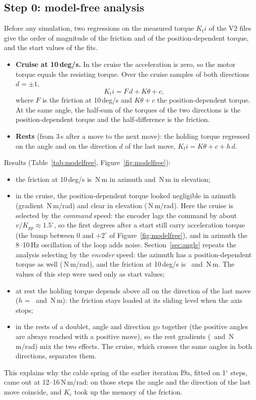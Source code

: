 \documentclass[10pt,a4paper]{article}
\numberwithin{equation}{section}
\begin{document}
\subsection{Step 0: model-free analysis}\label{sec:modelfree}
Before any simulation, two regressions on the measured torque $K_t i$ of the V2 files give the order of magnitude of the friction and of the position-dependent torque, and the start values of the fits.
\begin{itemize}
\item \textbf{Cruise at 10\,deg/s.} In the cruise the acceleration is zero, so the motor torque equals the resisting torque. Over the cruise samples of both directions $d=\pm1$,
\begin{equation}
K_t i = F\,d + K\theta + c ,\label{eq:cruise}
\end{equation}
where $F$ is the friction at 10\,deg/s and $K\theta+c$ the position-dependent torque. At the same angle, the half-sum of the torques of the two directions is the position-dependent torque and the half-difference is the friction.
\item \textbf{Rests} (from 3\,s after a move to the next move): the holding torque regressed on the angle and on the direction $d$ of the last move, $K_t i = K\theta+c+h\,d$.
\end{itemize}
Results (Table~\ref{tab:modelfree}, Figure~\ref{fig:modelfree}):
\begin{itemize}
\item the friction at 10\,deg/s is \FAz\,N\,m in azimuth and \FEl\,N\,m in elevation;
\item in the cruise, the position-dependent torque looked negligible in azimuth (gradient \KcrAz\,N\,m/rad) and clear in elevation (\KcrEl\,N\,m/rad). Here the cruise is selected by the \emph{command} speed: the encoder lags the command by about $v/K_{pp}\approx1.5^\circ$, so the first degrees after a start still carry acceleration torque (the bump between 0 and $+2^\circ$ of Figure~\ref{fig:modelfree}), and in azimuth the 8--10\,Hz oscillation of the loop adds noise. Section~\ref{sec:angle} repeats the analysis selecting by the \emph{encoder} speed: the azimuth has a position-dependent torque as well (\KencAz\,N\,m/rad), and the friction at 10\,deg/s is \FencAz\ and \FencEl\,N\,m. The values of this step were used only as start values;
\item at rest the holding torque depends above all on the direction of the last move ($h$ = \HrestAz\ and \HrestEl\,N\,m): the friction stays loaded at its sliding level when the axis stops;
\item in the rests of a doublet, angle and direction go together (the positive angles are always reached with a positive move), so the rest gradients (\KrestAz\ and \KrestEl\,N\,m/rad) mix the two effects. The cruise, which crosses the same angles in both directions, separates them.
\end{itemize}
This explains why the cable spring of the earlier iteration I9a, fitted on 1$^\circ$ steps, came out at 12--16\,N\,m/rad: on those steps the angle and the direction of the last move coincide, and $K_c$ took up the memory of the friction.
\end{document}
